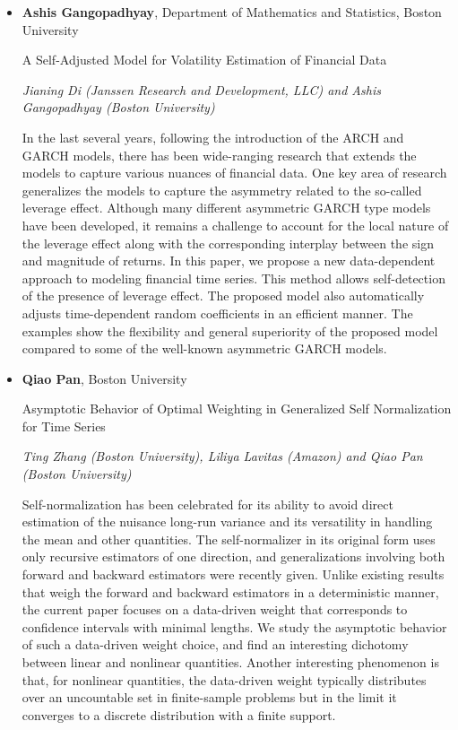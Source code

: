 \begin{itemize}
\item \textbf{Ashis Gangopadhyay}, Department of Mathematics and Statistics, Boston University

A Self-Adjusted Model for Volatility Estimation of Financial Data

\emph{\footnotesize Jianing Di (Janssen Research and Development, LLC) and Ashis Gangopadhyay (Boston University)}

In the last several years, following the introduction of the ARCH and GARCH models, there has been wide-ranging research that extends the models to capture various nuances of financial data. One key area of research generalizes the models to capture the asymmetry related to the so-called leverage effect.  Although many different asymmetric GARCH type models have been developed, it remains a challenge to account for the local nature of the leverage effect along with the corresponding interplay between the sign and magnitude of returns. In this paper, we propose a new data-dependent approach to modeling financial time series. This method allows self-detection of the presence of leverage effect. The proposed model also automatically adjusts time-dependent random coefficients in an efficient manner. The examples show the flexibility and general superiority of the proposed model compared to some of the well-known asymmetric GARCH models.

\item \textbf{Qiao Pan}, Boston University

Asymptotic Behavior of Optimal Weighting in Generalized Self Normalization for Time Series

\emph{\footnotesize Ting Zhang (Boston University), Liliya Lavitas (Amazon) and Qiao Pan (Boston University)}

Self-normalization has been celebrated for its ability to avoid direct estimation of the nuisance long-run variance and its versatility in handling the mean and other quantities. The self-normalizer in its original form uses only recursive estimators of one direction, and generalizations involving both forward and backward estimators were recently given. Unlike existing results that weigh the forward and backward estimators in a deterministic manner, the current paper focuses on a data-driven weight that corresponds to confidence intervals with minimal lengths. We study the asymptotic behavior of such a data-driven weight choice, and find an interesting dichotomy between linear and nonlinear quantities. Another interesting phenomenon is that, for nonlinear quantities, the data-driven weight typically distributes over an uncountable set in finite-sample problems but in the limit it converges to a discrete distribution with a finite support.

\end{itemize}

